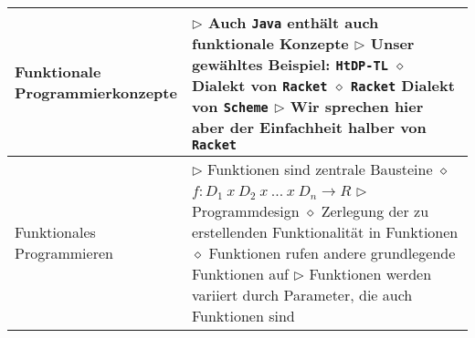   \begin{tabular}{ | p{} p{} | } 
  \hline 
  
  \makecell[l]{Funktionale \\ Programmierkonzepte} & \makecell[l]{
  $\rhd$ Auch \texttt{Java} enthält auch funktionale Konzepte \\
  $\rhd$ Unser gewähltes Beispiel: \texttt{HtDP-TL} \\
  \hspace{0.4cm} $\diamond$ Dialekt von \texttt{Racket} \\
  \hspace{0.4cm} $\diamond$ \texttt{Racket} Dialekt von \texttt{Scheme} \\
  $\rhd$ Wir sprechen hier aber der Einfachheit halber von \texttt{Racket}} \\ \hline
  
  \makecell[l]{Funktionales \\ Programmieren} & \makecell[l]{
  $\rhd$ Funktionen sind zentrale Bausteine \\
  \hspace{0.4cm} $\diamond$ $f: D_1 ~ x ~ D_2 ~ x ~ ... ~ x ~ D_n \rightarrow R$ \\
  $\rhd$ Programmdesign \\
  \hspace{0.4cm} $\diamond$ Zerlegung der zu erstellenden Funktionalität in Funktionen \\
  \hspace{0.4cm} $\diamond$ Funktionen rufen andere grundlegende Funktionen auf \\
  $\rhd$ Funktionen werden variiert durch Parameter, die auch Funktionen sind } \\ \hline


\end{tabular}
